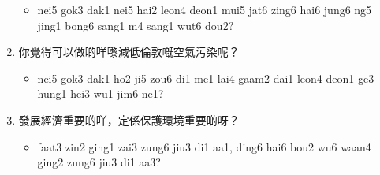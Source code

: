 \documentclass[12pt,a4paper]{leaflet}
\begin{document}
\begin{tcolorbox}[enhanced, breakable, skin first=enhanced, skin middle=enhanced, skin last=enhanced,colback=LightCoral!20!white, colframe=LightCoral!50!black, boxrule=0.5mm]
\begin{enumerate}[label={},leftmargin=0pt, itemindent=0pt]
\begin{itemize}[label={},leftmargin=0pt, itemindent=0pt]
\item \footnotesize\textsf{nei5 gok3 dak1 nei5 hai2 leon4 deon1 mui5 jat6 zing6 hai6 jung6 ng5 jing1 bong6 sang1 m4 sang1 wut6 dou2?}
\end{itemize}
\item \LARGE{你覺得可以做啲咩嚟減低倫敦嘅空氣污染呢？}
\begin{itemize}[label={},leftmargin=0pt, itemindent=0pt]
\item \footnotesize\textsf{nei5 gok3 dak1 ho2 ji5 zou6 di1 me1 lai4 gaam2 dai1 leon4 deon1 ge3 hung1 hei3 wu1 jim6 ne1?}
\end{itemize}
\item \LARGE{發展經濟重要啲吖，定係保護環境重要啲呀？}
\begin{itemize}[label={},leftmargin=0pt, itemindent=0pt]
\item \footnotesize\textsf{faat3 zin2 ging1 zai3 zung6 jiu3 di1 aa1, ding6 hai6 bou2 wu6 waan4 ging2 zung6 jiu3 di1 aa3?}
\end{itemize}
\end{enumerate}
\end{tcolorbox}
\end{document}
